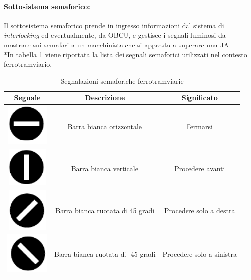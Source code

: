 \paragraph{Sottosistema semaforico:} 
Il sottosistema semaforico prende in ingresso informazioni dal sistema di \emph{interlocking} ed eventualmente, da OBCU, e gestisce i segnali luminosi da mostrare sui semafori a un macchinista che si appresta a superare una JA.\\*In tabella \ref{tab:sem} viene riportata la lista dei segnali semaforici utilizzati nel contesto ferrotramviario.
\begin{table}
\begin{tabular}{|c|c|c|}
	\hline 
	\textbf{Segnale} & \textbf{Descrizione} & \textbf{Significato} \\

	\hline
	\includegraphics{img/stopsemaphore}& Barra bianca orizzontale & Fermarsi \\ 
	\hline 
	\includegraphics{img/gosemaphore}& Barra bianca verticale  & Procedere avanti \\ 
	\hline 
	\includegraphics{img/rightsemaphore}& Barra bianca ruotata di 45 gradi & Procedere solo a destra \\ 
	\hline 
	\includegraphics{img/leftsemaphore}& Barra bianca ruotata di -45 gradi & Procedere solo a sinistra \\ 
	\hline 
\end{tabular} 
\caption{Segnalazioni semaforiche ferrotramviarie}
\label{tab:sem}
\end{table}
